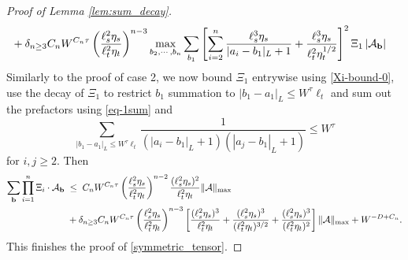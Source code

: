 \begin{proof}[Proof of Lemma \ref{lem:sum_decay}]
\begin{align}
&+\delta_{n\ge 3}C_n W^{C_n\tau} \left(\frac{\ell_s^{2} \eta_s}{\ell_t^{2} \eta_t}\right)^{n-3} \max_{b_2,\cdots, b_n}  \sum_{b_1}\left[\sum_{i=2}^n \frac{\ell_s^3\eta_s}{|a_i-b_1|_L+1}+\frac{\ell_s^3\eta_s}{\ell_t^2\eta_t^{1/2}}\right]^2 \Xi_1 \left|{\cal A}_{\textbf{b}}\right|\label{eq-2-first-der}
\end{align}
Similarly to the proof of case 2, we now bound $\Xi_1$ entrywise using \eqref{Xi-bound-0}, use the decay of $\Xi_1$ to restrict $b_1$ summation to $|b_1-a_1|_L\le W^\tau\ell_t$ and sum out the prefactors using \eqref{eq-1sum} and
\begin{equation}\label{eq-2sum}
   \sum_{|b_1-a_1|_L\le W^\tau\ell_t} \frac{1}{(|a_i-b_1|_L+1)(|a_j-b_1|_L+1)} \le W^{\tau} 
\end{equation}
for $i, j\ge 2$. Then 
\begin{align*}
\sum_{\textbf{b}}   \prod_{i=1}^n  \Xi_i  \cdot 
{\cal A}_{\textbf{b}} \;&\le\; C_n W^{C_n\tau} \left(\frac{\ell_s^{2} \eta_s}{\ell_t^{2} \eta_t}\right)^{n-2} \frac{(\ell_s^2\eta_s)^2}{\ell_t^2\eta_t}\|\mathcal{A}\|_{\max} \\
&+ \delta_{n\ge 3}C_n W^{C_n\tau} \left(\frac{\ell_s^{2} \eta_s}{\ell_t^{2} \eta_t}\right)^{n-3} \left[\frac{(\ell_s^2\eta_s)^3}{\ell_t^2\eta_t}+\frac{(\ell_s^2\eta_s)^3}{(\ell_t^2\eta_t)^{3/2}}+\frac{(\ell_s^2\eta_s)^3}{(\ell_t^2\eta_t)^2}\right] \|\mathcal{A}\|_{\max} + W^{-D+C_n}.
\end{align*}
This finishes the proof of \eqref{symmetric_tensor}.


\end{proof}
